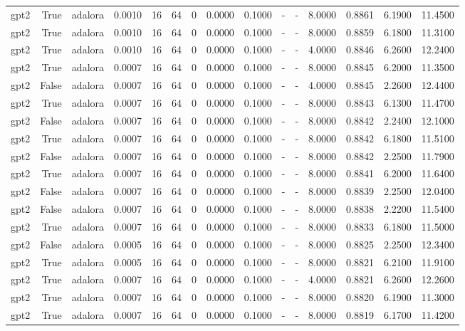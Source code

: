 \begin{tabular}{lrlrrrrrrlllrrr}
gpt2 & True & adalora & 0.0010 & 16 & 64 & 0 & 0.0000 & 0.1000 & - & - & 8.0000 & 0.8861 & 6.1900 & 11.4500 \\
gpt2 & True & adalora & 0.0010 & 16 & 64 & 0 & 0.0000 & 0.1000 & - & - & 8.0000 & 0.8859 & 6.1800 & 11.3100 \\
gpt2 & True & adalora & 0.0010 & 16 & 64 & 0 & 0.0000 & 0.1000 & - & - & 4.0000 & 0.8846 & 6.2600 & 12.2400 \\
gpt2 & True & adalora & 0.0007 & 16 & 64 & 0 & 0.0000 & 0.1000 & - & - & 8.0000 & 0.8845 & 6.2000 & 11.3500 \\
gpt2 & False & adalora & 0.0007 & 16 & 64 & 0 & 0.0000 & 0.1000 & - & - & 4.0000 & 0.8845 & 2.2600 & 12.4400 \\
gpt2 & True & adalora & 0.0007 & 16 & 64 & 0 & 0.0000 & 0.1000 & - & - & 8.0000 & 0.8843 & 6.1300 & 11.4700 \\
gpt2 & False & adalora & 0.0007 & 16 & 64 & 0 & 0.0000 & 0.1000 & - & - & 8.0000 & 0.8842 & 2.2400 & 12.1000 \\
gpt2 & True & adalora & 0.0007 & 16 & 64 & 0 & 0.0000 & 0.1000 & - & - & 8.0000 & 0.8842 & 6.1800 & 11.5100 \\
gpt2 & False & adalora & 0.0007 & 16 & 64 & 0 & 0.0000 & 0.1000 & - & - & 8.0000 & 0.8842 & 2.2500 & 11.7900 \\
gpt2 & True & adalora & 0.0007 & 16 & 64 & 0 & 0.0000 & 0.1000 & - & - & 8.0000 & 0.8841 & 6.2000 & 11.6400 \\
gpt2 & False & adalora & 0.0007 & 16 & 64 & 0 & 0.0000 & 0.1000 & - & - & 8.0000 & 0.8839 & 2.2500 & 12.0400 \\
gpt2 & False & adalora & 0.0007 & 16 & 64 & 0 & 0.0000 & 0.1000 & - & - & 8.0000 & 0.8838 & 2.2200 & 11.5400 \\
gpt2 & True & adalora & 0.0007 & 16 & 64 & 0 & 0.0000 & 0.1000 & - & - & 8.0000 & 0.8833 & 6.1800 & 11.5000 \\
gpt2 & False & adalora & 0.0005 & 16 & 64 & 0 & 0.0000 & 0.1000 & - & - & 8.0000 & 0.8825 & 2.2500 & 12.3400 \\
gpt2 & True & adalora & 0.0005 & 16 & 64 & 0 & 0.0000 & 0.1000 & - & - & 8.0000 & 0.8821 & 6.2100 & 11.9100 \\
gpt2 & True & adalora & 0.0007 & 16 & 64 & 0 & 0.0000 & 0.1000 & - & - & 4.0000 & 0.8821 & 6.2600 & 12.2600 \\
gpt2 & True & adalora & 0.0007 & 16 & 64 & 0 & 0.0000 & 0.1000 & - & - & 8.0000 & 0.8820 & 6.1900 & 11.3000 \\
gpt2 & True & adalora & 0.0007 & 16 & 64 & 0 & 0.0000 & 0.1000 & - & - & 8.0000 & 0.8819 & 6.1700 & 11.4200 \\

\end{tabular}
